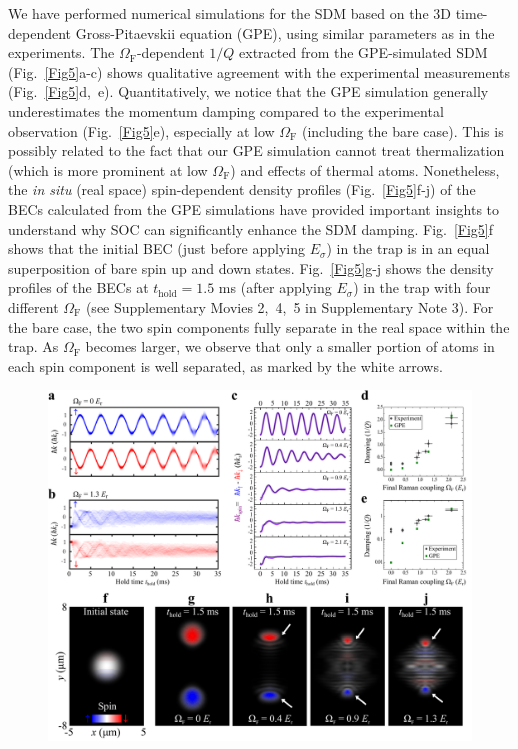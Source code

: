 \documentclass[showpacs,preprintnumbers,amsmath,amssymb, superscriptaddress, aps, reprint]{revtex4-1}
\def\OmegaF{\Omega_{\text{F}}}
\def\thold{t_{\text{hold}}}
\begin{document}
{We have performed numerical simulations {for the SDM} based on the 3D time-dependent Gross-Pitaevskii equation (GPE), using similar parameters as in the experiments. 
The $\OmegaF$-dependent $1/Q$ extracted from the {GPE-simulated SDM (Fig.~{\ref{Fig5}}a-c)} shows qualitative agreement with the experimental measurements {({Fig.~{\ref{Fig5}}}d,~e)}.  
{Quantitatively, we notice that the GPE simulation generally underestimates the momentum damping compared to the experimental observation ({Fig.~{\ref{Fig5}}}e), especially at low $\OmegaF$ (including the bare case). 
This is possibly related to the fact that our GPE simulation cannot treat thermalization (which is more prominent at low $\OmegaF$) and effects of thermal atoms.} 
Nonetheless, the \textit{in situ} (real space) spin-dependent density profiles {(Fig.~{\ref{Fig5}}f-j)} of the BECs calculated from the GPE simulations have provided important insights to understand why SOC can significantly enhance the SDM damping. {Fig.~{\ref{Fig5}}f} shows that the initial BEC (just before applying $E_{\sigma}$) in the trap is in an equal superposition of bare spin up and down states. {Fig.~{\ref{Fig5}}g-j} shows the density profiles of the BECs at $\thold = 1.5$ ms (after applying $E_{\sigma}$) in the trap with four different $\OmegaF$ (see Supplementary Movies 2,~4,~5 in Supplementary Note 3). For the bare case, the two spin components fully separate in the real space within the trap. As $\OmegaF$ becomes larger, we observe that only a smaller portion of atoms in each spin component is well separated, as marked by the white arrows. 
\begin{figure}[ht]
\centering
\includegraphics[width=6.0in]{Fig6_GPE_Vfinal.pdf}

\end{figure}}
\end{document}
